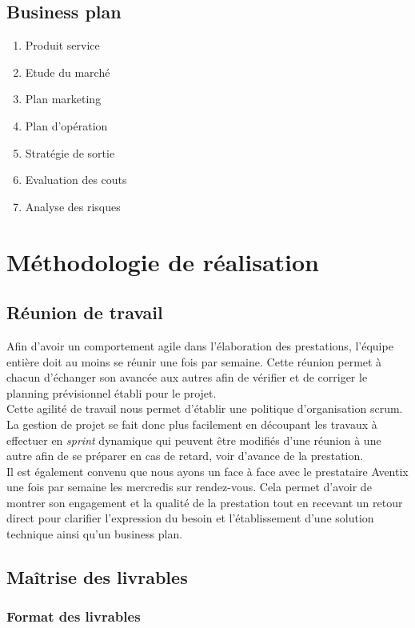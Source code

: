 \documentclass[11pt, a4paper]{article}
\begin{document}
\subsection{Business plan}
\begin{enumerate}
  \item Produit service
  \item Etude du marché
  \item Plan marketing
  \item Plan d'opération
  \item Stratégie de sortie
  \item Evaluation des couts
  \item Analyse des risques
\end{enumerate}

\section{Méthodologie de réalisation}
\subsection{Réunion de travail}
Afin d'avoir un comportement agile dans l'élaboration des prestations, l'équipe
entière doit au moins se réunir une fois par semaine.
Cette réunion permet à chacun d'échanger son avancée aux autres afin de
vérifier et de corriger le planning prévisionnel établi pour le projet. \\

Cette agilité de travail nous permet d'établir une politique d'organisation scrum.
La gestion de projet se fait donc plus facilement en découpant les travaux à
effectuer en \textit{sprint} dynamique qui peuvent être modifiés d'une réunion
à une autre afin de se préparer en cas de retard, voir d'avance de la
prestation. \\

Il est également convenu que nous ayons un face à face avec le prestataire
Aventix une fois par semaine les mercredis sur rendez-vous. Cela permet d'avoir
de montrer son engagement et la qualité de la prestation tout en recevant un
retour direct pour clarifier l'expression du besoin et l'établissement d'une
solution technique ainsi qu'un business plan. \\

\subsection{Maîtrise des livrables}
\subsubsection{Format des livrables}
\end{document}
